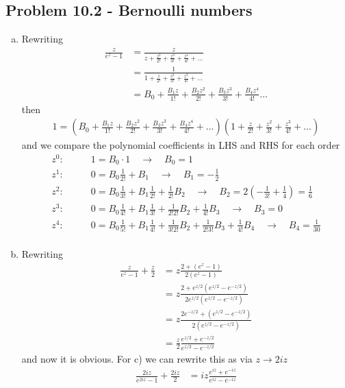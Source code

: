 \documentclass[10pt,a4paper]{book}
\theoremstyle{definition}
\begin{document}
\subsection{Problem 10.2 - Bernoulli numbers}
\begin{enumerate}[a)]
\item Rewriting
\begin{align}
\frac{z}{e^z-1}
&=\frac{z}{z+\frac{z^2}{2!}+\frac{z^3}{3!}+\frac{z^4}{4!}+...}\\
&=\frac{1}{1+\frac{z}{2!}+\frac{z^2}{3!}+\frac{z^3}{4!}+...}\\
&=B_0+\frac{B_1z}{1!}+\frac{B_2z^2}{2!}+\frac{B_3z^3}{3!}+\frac{B_4z^4}{4!}...
\end{align}
then
\begin{align}
1=\left(B_0+\frac{B_1z}{1!}+\frac{B_2z^2}{2!}+\frac{B_3z^3}{3!}+\frac{B_4z^4}{4!}+...\right)\left(1+\frac{z}{2!}+\frac{z^2}{3!}+\frac{z^3}{4!}+...\right)
\end{align}
and we compare the polynomial coefficients in LHS and RHS for each order
\begin{align}
z^0:&\qquad 1=B_0\cdot1\quad\rightarrow\quad B_0=1\\
z^1:&\qquad 0=B_0\frac{1}{2!}+B_1\quad\rightarrow\quad B_1=-\frac{1}{2}\\
z^2:&\qquad 0=B_0\frac{1}{3!}+B_1\frac{1}{2!}+\frac{1}{2!}B_2\quad\rightarrow\quad B_2=2\left(-\frac{1}{3!}+\frac{1}{4}\right)=\frac{1}{6}\\
z^3:&\qquad 0=B_0\frac{1}{4!}+B_1\frac{1}{3!}+\frac{1}{2!2!}B_2+\frac{1}{4!}B_3\quad\rightarrow\quad B_3=0\\
z^4:&\qquad 0=B_0\frac{1}{5!}+B_1\frac{1}{4!}+\frac{1}{3!2!}B_2+\frac{1}{2!3!}B_3+\frac{1}{4!}B_4\quad\rightarrow\quad B_4=\frac{1}{30}\\
\end{align}
\item Rewriting
\begin{align}
\frac{z}{e^z-1}+\frac{z}{2}
&=z\frac{2+(e^z-1)}{2(e^z-1)}\\
&=z\frac{2+e^{z/2}(e^{z/2}-e^{-z/2})}{2e^{z/2}(e^{z/2}-e^{-z/2})}\\
&=z\frac{2e^{-z/2}+(e^{z/2}-e^{-z/2})}{2(e^{z/2}-e^{-z/2})}\\
&=\frac{z}{2}\frac{e^{z/2}+e^{-z/2}}{e^{z/2}-e^{-z/2}}
\end{align}
and now it is obvious. For c) we can rewrite this as via $z\rightarrow2iz$
\begin{align}
\frac{2iz}{e^{2iz}-1}+\frac{2iz}{2}&=iz\frac{e^{iz}+e^{-iz}}{e^{iz}-e^{-iz}}
\end{align} 
  

\end{enumerate}
\end{document}
